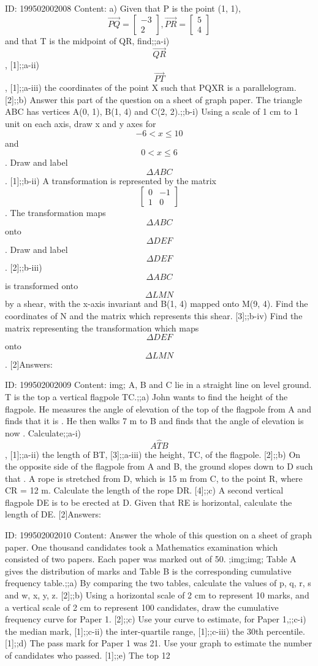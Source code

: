 \documentclass{article}
\begin{document}
ID: 199502002008
Content:
a) Given that P is the point (1, 1), $$\vec{PQ} = \begin{bmatrix}-3\\2\end{bmatrix}, \vec{PR} = \begin{bmatrix}5\\4\end{bmatrix}$$ and that T is the midpoint of QR, find;;a-i) $$\vec{QR}$$, [1];;a-ii) $$\vec{PT}$$, [1];;a-iii) the coordinates of the point X such that PQXR is a parallelogram. [2];;b) Answer this part of the question on a sheet of graph paper. The triangle ABC has vertices A(0, 1), B(1, 4) and C(2, 2).;;b-i) Using a scale of 1 cm to 1 unit on each axis, draw x and y axes for $$-6 < x \leq 10$$ and $$0 < x \leq 6$$. Draw and label $$\Delta ABC$$. [1];;b-ii) A transformation is represented by the matrix $$\begin{bmatrix}0&-1\\1&0\end{bmatrix}$$. The transformation maps $$\Delta ABC$$ onto $$\Delta DEF$$. Draw and label $$\Delta DEF$$. [2];;b-iii) $$\Delta ABC$$ is transformed onto $$\Delta LMN$$ by a shear, with the x-axis invariant and B(1, 4) mapped onto M(9, 4). Find the coordinates of N and the matrix which represents this shear. [3];;b-iv) Find the matrix representing the transformation which maps $$\Delta DEF$$onto $$\Delta LMN$$. [2]Answers:

ID: 199502002009
Content:
img; A, B and C lie in a straight line on level ground. T is the top a vertical flagpole TC.;;a) John wants to find the height of the flagpole. He measures the angle of elevation of the top of the flagpole from A and finds that it is  . He then walks 7 m to B and finds that the angle of elevation is now  . Calculate;;a-i) $$A \hat TB$$, [1];;a-ii) the length of BT, [3];;a-iii) the height, TC, of the flagpole. [2];;b) On the opposite side of the flagpole from A and B, the ground slopes down to D such that . A rope is stretched from D, which is 15 m from C, to the point R, where CR = 12 m. Calculate the length of the rope DR. [4];;c) A second vertical flagpole DE is to be erected at D. Given that RE is horizontal, calculate the length of DE. [2]Answers:

ID: 199502002010
Content:
Answer the whole of this question on a sheet of graph paper. One thousand candidates took a Mathematics examination which consisted of two papers. Each paper was marked out of 50. ;img;img; Table A gives the distribution of marks and Table B is the corresponding cumulative frequency table.;;a) By comparing the two tables, calculate the values of p, q, r, s and w, x, y, z. [2];;b) Using a horizontal scale of 2 cm to represent 10 marks, and a vertical scale of 2 cm to represent 100 candidates, draw the cumulative frequency curve for Paper 1. [2];;c) Use your curve to estimate, for Paper 1,;;c-i) the median mark, [1];;c-ii) the inter-quartile range, [1];;c-iii) the 30th percentile. [1];;d) The pass mark for Paper 1 was 21. Use your graph to estimate the number of candidates who passed. [1];;e) The top 12%
\end{document}
